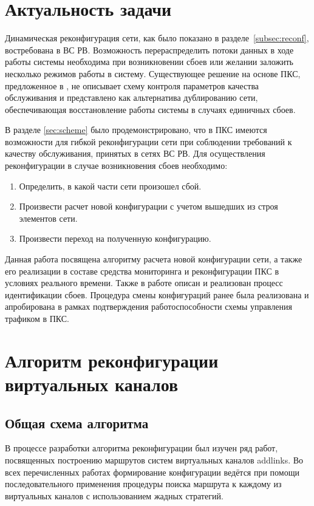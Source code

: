 \documentclass[12pt, a4paper]{article}
\begin{document}
\section{Актуальность задачи}
Динамическая реконфигурация сети, как было показано в разделе~\ref{subsec:reconf}, востребована в ВС РВ. Возможность перераспределить потоки данных в ходе работы системы необходима при возникновении сбоев или желании заложить несколько режимов работы в систему. Существующее решение на основе ПКС, предложенное в \cite{fakevlsdn}, не описывает схему контроля параметров качества обслуживания и представлено как альтернатива дублированию сети, обеспечивающая восстановление работы системы в случаях единичных сбоев. 

В разделе \ref{sec:scheme} было продемонстрировано, что в ПКС имеются возможности для гибкой реконфигурации сети при соблюдении требований к качеству обслуживания, принятых в сетях ВС РВ. Для осуществления реконфигурации в случае возникновения сбоев необходимо:
\begin{enumerate}
	\item Определить, в какой части сети произошел сбой.
	\item Произвести расчет новой конфигурации с учетом вышедших из строя элементов сети.
	\item Произвести переход на полученную конфигурацию.
\end{enumerate}

Данная работа посвящена алгоритму расчета новой конфигурации сети, а также его реализации в составе средства мониторинга и реконфигурации ПКС в условиях реального времени. Также в работе описан и реализован процесс идентификации сбоев. Процедура смены конфигураций ранее была реализована и апробирована в рамках подтверждения работоспособности схемы управления трафиком в ПКС.

\section{Алгоритм реконфигурации виртуальных каналов} \label{sec:alg}
\subsection{Общая схема алгоритма}

В процессе разработки алгоритма реконфигурации был изучен ряд работ, посвященных построению маршрутов систем виртуальных каналов addlinks. Во всех перечисленных работах формирование конфигурации ведётся при помощи последовательного применения процедуры поиска маршрута к каждому из виртуальных каналов с использованием жадных стратегий.
\end{document}
